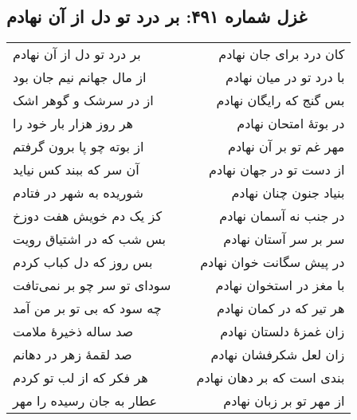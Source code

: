 \begin{center}
\section*{غزل شماره ۴۹۱: بر درد تو دل از آن نهادم}
\label{sec:491}
\begin{longtable}{l p{0.5cm} r}
بر درد تو دل از آن نهادم
&&
کان درد برای جان نهادم
\\
از مال جهانم نیم جان بود
&&
با درد تو در میان نهادم
\\
از در سرشک و گوهر اشک
&&
بس گنج که رایگان نهادم
\\
هر روز هزار بار خود را
&&
در بوتهٔ امتحان نهادم
\\
از بوته چو پا برون گرفتم
&&
مهر غم تو بر آن نهادم
\\
آن سر که ببند کس نیاید
&&
از دست تو در جهان نهادم
\\
شوریده به شهر در فتادم
&&
بنیاد جنون چنان نهادم
\\
کز یک دم خویش هفت دوزخ
&&
در جنب نه آسمان نهادم
\\
بس شب که در اشتیاق رویت
&&
سر بر سر آستان نهادم
\\
بس روز که دل کباب کردم
&&
در پیش سگانت خوان نهادم
\\
سودای تو سر چو بر نمی‌تافت
&&
با مغز در استخوان نهادم
\\
چه سود که بی تو بر من آمد
&&
هر تیر که در کمان نهادم
\\
صد ساله ذخیرهٔ ملامت
&&
زان غمزهٔ دلستان نهادم
\\
صد لقمهٔ زهر در دهانم
&&
زان لعل شکرفشان نهادم
\\
هر فکر که از لب تو کردم
&&
بندی است که بر دهان نهادم
\\
عطار به جان رسیده را مهر
&&
از مهر تو بر زبان نهادم
\\
\end{longtable}
\end{center}
